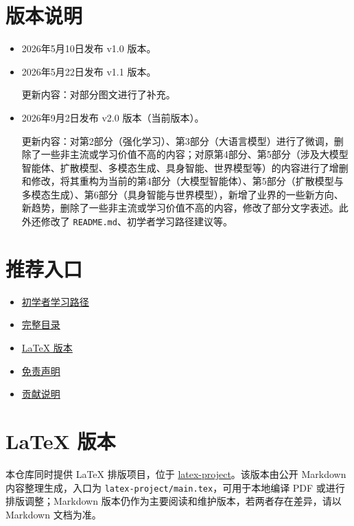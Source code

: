 \hypertarget{ux7248ux672cux8bf4ux660e}{%
\section{版本说明}\label{ux7248ux672cux8bf4ux660e}}

\begin{itemize}
\item
  2026年5月10日发布 v1.0 版本。
\item
  2026年5月22日发布 v1.1 版本。

  更新内容：对部分图文进行了补充。
\item
  2026年9月2日发布 v2.0 版本（当前版本）。

  更新内容：对第2部分（强化学习）、第3部分（大语言模型）进行了微调，删除了一些非主流或学习价值不高的内容；对原第4部分、第5部分（涉及大模型智能体、扩散模型、多模态生成、具身智能、世界模型等）的内容进行了增删和修改，将其重构为当前的第4部分（大模型智能体）、第5部分（扩散模型与多模态生成）、第6部分（具身智能与世界模型），新增了业界的一些新方向、新趋势，删除了一些非主流或学习价值不高的内容，修改了部分文字表述。此外还修改了 \texttt{README.md}、初学者学习路径建议等。
\end{itemize}

\hypertarget{ux63a8ux8350ux5165ux53e3}{%
\section{推荐入口}\label{ux63a8ux8350ux5165ux53e3}}

\begin{itemize}
\tightlist
\item
  \href{初学者学习路径.md}{初学者学习路径}
\item
  \href{目录.md}{完整目录}
\item
  \href{latex-project/README.md}{LaTeX 版本}
\item
  \href{DISCLAIMER.md}{免责声明}
\item
  \href{CONTRIBUTING.md}{贡献说明}
\end{itemize}

\hypertarget{latex-ux7248ux672c}{%
\section{LaTeX 版本}\label{latex-ux7248ux672c}}

本仓库同时提供 LaTeX 排版项目，位于 \href{latex-project/README.md}{latex-project}。该版本由公开 Markdown 内容整理生成，入口为 \texttt{latex-project/main.tex}，可用于本地编译 PDF 或进行排版调整；Markdown 版本仍作为主要阅读和维护版本，若两者存在差异，请以 Markdown 文档为准。

